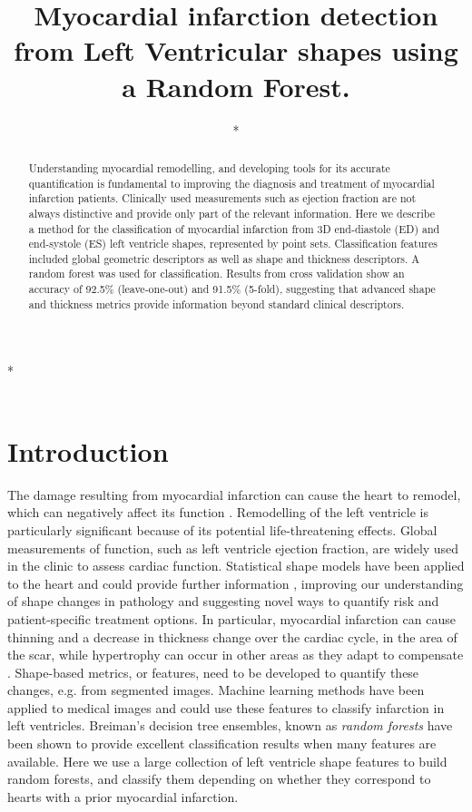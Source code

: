 \documentclass{llncs}
\begin{document}
\title{Myocardial infarction detection from Left Ventricular shapes using a Random Forest.}

\author{*}

\institute
{*\\
\email{*}\\
}
\maketitle              %
\begin{abstract}
Understanding myocardial remodelling, and developing tools for its accurate quantification is fundamental to improving the diagnosis and treatment of myocardial infarction patients. Clinically used measurements such as ejection fraction are not always distinctive and provide only part of the relevant information.  Here we describe a method for the classification of myocardial infarction from 3D end-diastole (ED) and end-systole (ES) left ventricle shapes, represented by point sets. Classification features included global geometric descriptors as well as shape and thickness descriptors. A random forest was used for classification. Results from cross validation show an accuracy of 92.5\% (leave-one-out) and 91.5\% (5-fold), suggesting that advanced shape and thickness metrics provide information beyond standard clinical descriptors.
\end{abstract}
%
\section{Introduction}
The damage resulting from myocardial infarction can cause the heart to remodel, which can negatively affect its function \cite{Sutton2000}. Remodelling of the left ventricle is particularly significant because of its potential life-threatening effects. 
Global measurements of function, such as left ventricle ejection fraction, are widely used in the clinic to assess cardiac function. Statistical shape models \cite{Cootes1992} have been applied to the heart and could provide further information \cite{Lewandowski2012,Young2009,Lorenz2006}, improving our understanding of shape changes in pathology and suggesting novel ways to quantify risk and patient-specific treatment options. In particular, myocardial infarction can cause thinning and a decrease in thickness change over the cardiac cycle, in the area of the scar, while hypertrophy can occur in other areas as they adapt to compensate \cite{Sutton2000}. Shape-based metrics, or features, need to be developed to quantify these changes, e.g. from segmented images. Machine learning methods have been applied to medical images \cite{Mantilla2013,Wernick2010} and could use these features to classify infarction in left ventricles. Breiman's decision tree ensembles, known as \emph{random forests} \cite{Breiman2001} have been shown to provide excellent classification results when many features are available. Here we use a large collection of left ventricle shape features to build random forests, and classify them depending on whether they correspond to hearts with a prior myocardial infarction.
\end{document}
